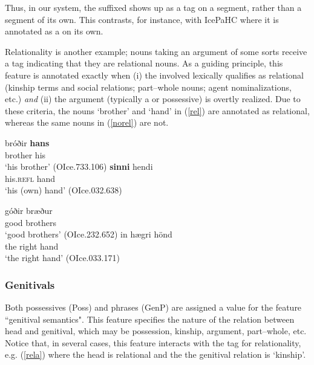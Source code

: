 \documentclass[output=paper,colorlinks,citecolor=brown]{langscibook}
\begin{document}
Thus, in our system, the suffixed  shows up as a tag on a segment, rather than a segment of its own. This contrasts, for instance, with IcePaHC \citep{IcePaHC,rognvaldsson-etal:2012} %
where it is annotated as a  on its own.  

Relationality is another example; nouns taking an argument of some sorts receive a tag indicating that they are relational nouns. As a guiding principle, this feature is annotated  exactly when (i) the  involved lexically qualifies as relational (kinship terms and social relations; part--whole nouns; agent nominalizations, etc.)  \textit{and} (ii) the argument (typically a  or possessive) is overtly realized. Due to these criteria, the nouns `brother' and `hand' in (\ref{rel}) are annotated as relational, whereas the same nouns in (\ref{norel}) are not.

\newlength{\tempcolumnsep}
\setlength{\tempcolumnsep}{\columnsep}
\setlength{\columnsep}{-1em}
\begin{multicols}{2}
\ea \label{rel}
    \ea \label{rela} \gll bróðir \textbf{hans}\\   
             brother      his     \\
        \glt `his brother' (OIce.733.106)
    \ex \gll \textbf{sinni}    hendi\\
             his.\textsc{refl} hand \\
        \glt `his (own) hand' (OIce.032.638)
    \z
\z
\end{multicols}
\begin{multicols}{2}
\ea \label{norel}
    \ea \gll góðir bræður\\  
             good        brothers\\
        \glt `good brothers' (OIce.232.652)
    \ex \gll  in  hægri hönd\\  
              the right     hand\\
        \glt `the right hand' (OIce.033.171)
    \z
\z
\end{multicols}
\setlength{\columnsep}{\tempcolumnsep}




\subsubsection{Genitivals} 

Both possessives (Poss) and  phrases (GenP) are assigned a value for the feature ``genitival semantics". This feature specifies the nature of the relation between head  and genitival, which may be possession, kinship, argument, part--whole, etc. Notice that, in several cases, this feature interacts with the tag for relationality, e.g. (\ref{rela}) where the head  is relational and the the genitival relation is `kinship'.
\end{document}
